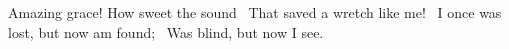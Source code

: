 Amazing grace! How sweet the sound 
That saved a wretch like me! 
I once was lost, but now am found; 
Was blind, but now I see. 
